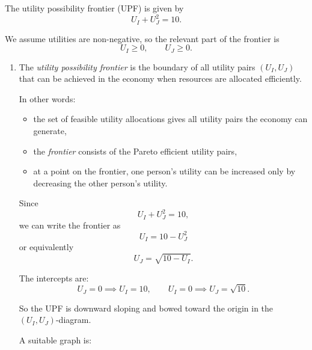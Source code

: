\documentclass[12pt]{article}
\begin{document}
The utility possibility frontier (UPF) is given by
\[
U_I + U_J^2 = 10.
\]

We assume utilities are non-negative, so the relevant part of the frontier is
\[
U_I \ge 0,\qquad U_J \ge 0.
\]

\begin{enumerate}[label=(\alph*)]
    \item
    The \emph{utility possibility frontier} is the boundary of all utility pairs \((U_I,U_J)\) that can be achieved in the economy when resources are allocated efficiently.

    In other words:
    \begin{itemize}
        \item the set of feasible utility allocations gives all utility pairs the economy can generate,
        \item the \emph{frontier} consists of the Pareto efficient utility pairs,
        \item at a point on the frontier, one person's utility can be increased only by decreasing the other person's utility.
    \end{itemize}

    Since
    \[
    U_I + U_J^2 = 10,
    \]
    we can write the frontier as
    \[
    U_I = 10 - U_J^2
    \]
    or equivalently
    \[
    U_J = \sqrt{10-U_I}.
    \]

    The intercepts are:
    \[
    U_J=0 \implies U_I=10,
    \qquad
    U_I=0 \implies U_J=\sqrt{10}.
    \]

    So the UPF is downward sloping and bowed toward the origin in the \((U_I,U_J)\)-diagram.

    A suitable graph is:

    \begin{center}
    \end{center}


\end{enumerate}
\end{document}
